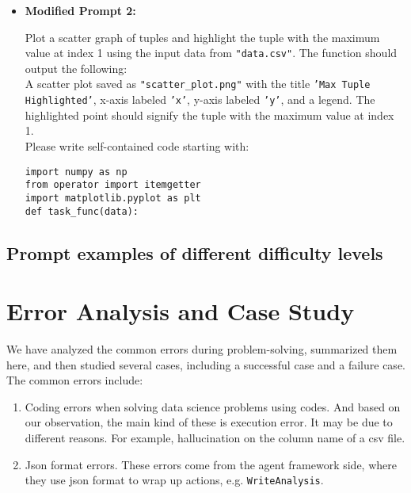 \begin{itemize}
    \item \textbf{Modified Prompt 2:}
    
\begin{tcolorbox}[colback=blue!5!white, colframe=blue!75!black, title=Modified Prompt 2:, text width=\textwidth]
Plot a scatter graph of tuples and highlight the tuple with the maximum value at index 1 using the input data from \texttt{"data.csv"}. The function should output the following: \\

A scatter plot saved as \texttt{"scatter\_plot.png"} with the title \texttt{'Max Tuple Highlighted'}, x-axis labeled \texttt{'x'}, y-axis labeled \texttt{'y'}, and a legend. The highlighted point should signify the tuple with the maximum value at index 1. \\

Please write self-contained code starting with:
\begin{verbatim}
import numpy as np
from operator import itemgetter
import matplotlib.pyplot as plt
def task_func(data):
\end{verbatim}
\end{tcolorbox}

\end{itemize}



\subsection{Prompt examples of different difficulty levels}












\clearpage\newpage
\section{Error Analysis and Case Study}
We have analyzed the common errors during problem-solving, summarized them here, and then studied several cases, including a successful case and a failure case.
The common errors include:
\begin{enumerate}
    \item Coding errors when solving data science problems using codes. And based on our observation, the main kind of these is execution error. It may be due to different reasons. For example, hallucination on the column name of a csv file.
    \item Json format errors. These errors come from the agent framework side, where they use json format to wrap up actions, e.g. \texttt{WriteAnalysis}.
\end{enumerate}



